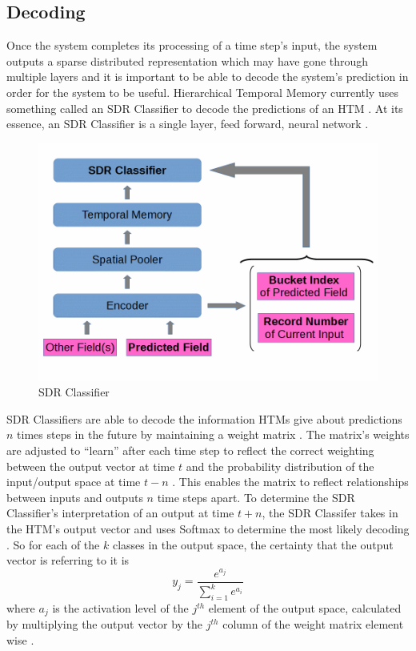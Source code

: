 \documentclass[fleqn,minimal]{article}
\begin{document}
	\subsection{Decoding}
	
	Once the system completes its processing of a time step's input, the system outputs a sparse distributed representation which may have gone through multiple layers and it is important to be able to decode the system's prediction in order for the system to be useful. Hierarchical Temporal Memory currently uses something called an SDR Classifier to decode the predictions of an HTM \cite{Dillon}. At its essence, an SDR Classifier is a single layer, feed forward, neural network \cite{Dillon}.
	
	\begin{figure}[h!]
		\centering
		\includegraphics[width=\linewidth]{images/SDRClassifier.jpg}
		\caption{SDR Classifier}
		\label{fig 3}
	\end{figure}
	
	SDR Classifiers are able to decode the information HTMs give about predictions $n$ times steps in the future by maintaining a weight matrix \cite{Dillon}. The matrix's weights are adjusted to ``learn'' after each time step to reflect the correct weighting between the output vector at time $t$ and the probability distribution of the input/output space at time $t-n$ \cite{Dillon}. This enables the matrix to reflect relationships between inputs and outputs $n$ time steps apart. To determine the SDR Classifier's interpretation of an output at time $t+n$, the SDR Classifer takes in the HTM's output vector and uses Softmax to determine the most likely decoding \cite{Dillon}. So for each of the $k$ classes in the output space, the certainty that the output vector is referring to it is $$y_{j} = \dfrac{e^{a_{j}}}{\sum_{i=1}^{k} e^{a_{i}}}$$ where $a_{j}$ is the activation level of the $j^{th}$ element of the output space, calculated by multiplying the output vector by the $j^{th}$ column of the weight matrix element wise \cite{Dillon}. 
	
\end{document}
